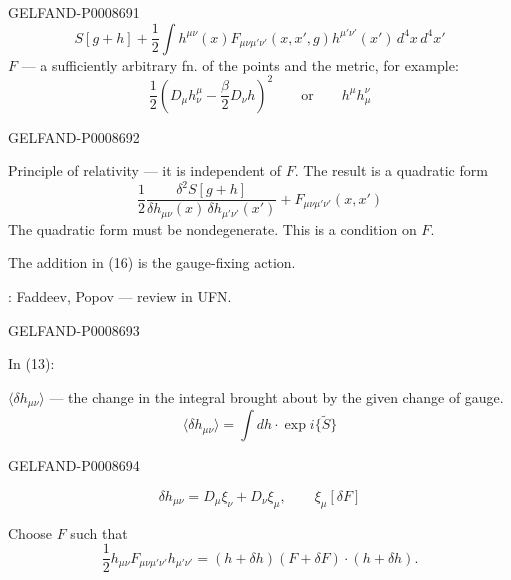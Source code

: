 \begin{GelfandAdjacentEvidence}{GELFAND-P000869}{1}
\begin{equation*}
S[g+h]+\frac12\int h^{\mu\nu}(x)
F_{\mu\nu\mu'\nu'}(x,x',g)h^{\mu'\nu'}(x')\,d^4x\,d^4x'
\tag{16}
\end{equation*}
$F$ --- a sufficiently arbitrary fn. of the points and the metric, for example:
\begin{equation*}
\frac12\left(D_\mu h^\mu_\nu-\frac\beta2D_\nu h\right)^2
\qquad\text{or}\qquad h^\mu h_\mu^\nu
\tag{17}
\end{equation*}
\end{GelfandAdjacentEvidence}
\begin{GelfandAdjacentEvidence}{GELFAND-P000869}{2}


Principle of relativity --- it is independent of $F$. The result is a quadratic form
\begin{equation*}
\frac12\frac{\delta^2S[g+h]}{\delta h_{\mu\nu}(x)\,\delta h_{\mu'\nu'}(x')}
+F_{\mu\nu\mu'\nu'}(x,x')
\tag{18}
\end{equation*}
The quadratic form must be nondegenerate. This is a condition on $F$.

The addition in (16) is the gauge-fixing action.

: Faddeev, Popov --- review in UFN.

\end{GelfandAdjacentEvidence}
\begin{GelfandAdjacentEvidence}{GELFAND-P000869}{3}

In (13):

$\langle\delta h_{\mu\nu}\rangle$ --- the change in the integral brought about by the given change of gauge.
\[
\langle\delta h_{\mu\nu}\rangle=\int dh\cdot\exp i\{\widetilde S\}
\]
\end{GelfandAdjacentEvidence}
\begin{GelfandAdjacentEvidence}{GELFAND-P000869}{4}

\begin{equation*}
\delta h_{\mu\nu}=D_\mu\xi_\nu+D_\nu\xi_\mu,\qquad
\xi_\mu[\delta F]
\tag{19}
\end{equation*}

Choose $F$ such that
\begin{equation*}
\frac12h_{\mu\nu}F_{\mu\nu\mu'\nu'}h_{\mu'\nu'}
=(h+\delta h)(F+\delta F)\cdot(h+\delta h).
\tag{20}
\end{equation*}
\end{GelfandAdjacentEvidence}
